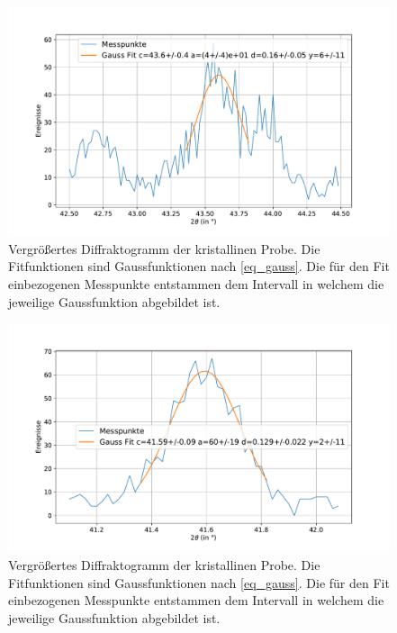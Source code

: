 \documentclass[
	a4paper,
	12pt,
	pagesize,
	ngerman
]{scrartcl}
\begin{document}
	\begin{figure}[H]
			\includegraphics[width=\linewidth]{img/XRD_Kristallin_43,5_1.pdf}
			\caption{
				Vergrößertes Diffraktogramm der kristallinen Probe.
				Die Fitfunktionen sind Gaussfunktionen nach \cref{eq_gauss}.
				Die für den Fit einbezogenen Messpunkte entstammen dem Intervall in welchem die jeweilige Gaussfunktion abgebildet ist.
				}
			\label{fig_xrd_kristall_1}
	\end{figure}
	\begin{figure}[H]
			\includegraphics[width=\linewidth]{img/XRD_Kristallin_41,6_0,5.pdf}
			\caption{
				Vergrößertes Diffraktogramm der kristallinen Probe.
				Die Fitfunktionen sind Gaussfunktionen nach \cref{eq_gauss}.
				Die für den Fit einbezogenen Messpunkte entstammen dem Intervall in welchem die jeweilige Gaussfunktion abgebildet ist.
				}
			\label{fig_xrd_kristall_2}
	\end{figure}
\end{document}
